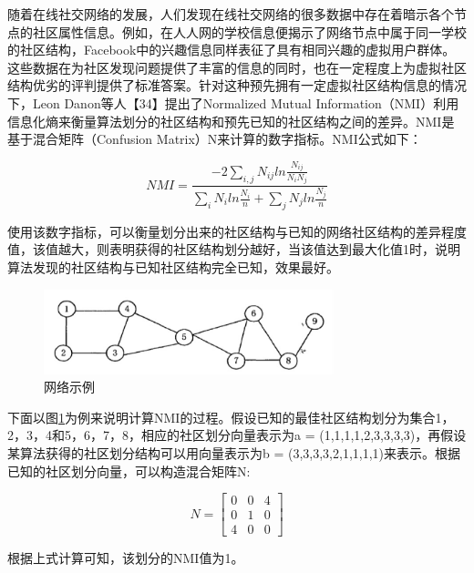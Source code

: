 随着在线社交网络的发展，人们发现在线社交网络的很多数据中存在着暗示各个节点的社区属性信息。例如，在人人网的学校信息便揭示了网络节点中属于同一学校的社区结构，Facebook中的兴趣信息同样表征了具有相同兴趣的虚拟用户群体。这些数据在为社区发现问题提供了丰富的信息的同时，也在一定程度上为虚拟社区结构优劣的评判提供了标准答案。针对这种预先拥有一定虚拟社区结构信息的情况下，Leon Danon等人【34】提出了Normalized Mutual Information（NMI）利用信息化熵来衡量算法划分的社区结构和预先已知的社区结构之间的差异。NMI是基于混合矩阵（Confusion Matrix）N来计算的数字指标。NMI公式如下：

\begin{equation}
  \label{eqn:LBmodel}
  NMI=\frac{ -2 \sum_{i,j} N_{ij}  ln{\frac{N_{ij}}{N_iN_j}} } {\sum_{i}N_iln{\frac{N_i}{n}}+\sum_{j}N_jln{\frac{N_j}{n}}}
\end{equation}

使用该数字指标，可以衡量划分出来的社区结构与已知的网络社区结构的差异程度值，该值越大，则表明获得的社区结构划分越好，当该值达到最大化值1时，说明算法发现的社区结构与已知社区结构完全已知，效果最好。

\begin{figure}
  \centering
  \includegraphics[width=0.75\textwidth]{figures/fig2-2}
  \caption{网络示例}\label{fig:fig2-2}
\end{figure}

下面以图\ref{fig:fig2-2}为例来说明计算NMI的过程。假设已知的最佳社区结构划分为集合{1，2，3，4}和{5，6，7，8}，相应的社区划分向量表示为a = (1,1,1,1,2,3,3,3,3)，再假设某算法获得的社区划分结构可以用向量表示为b = (3,3,3,3,2,1,1,1,1)来表示。根据已知的社区划分向量，可以构造混合矩阵N:

\begin{equation}
  \label{eqn:LBmodel}
  N=\begin{bmatrix}
    0 & 0 &4 \\ 
    0 & 1 & 0\\ 
    4 & 0 & 0
    \end{bmatrix}
\end{equation}

根据上式计算可知，该划分的NMI值为1。
